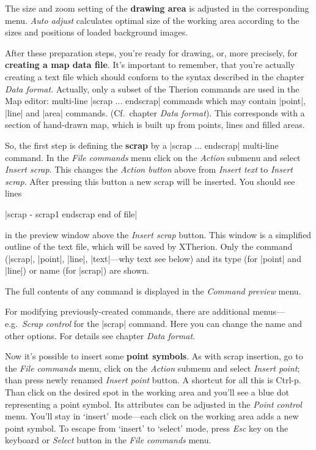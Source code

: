 The size and zoom setting of the {\bf drawing area} is adjusted in the 
corresponding menu. {\it Auto adjust} calculates optimal size of the working 
area according to the sizes and positions of loaded background images.

After these preparation steps, you're ready for drawing, or, more 
precisely, for {\bf creating a map data file}. It's important to remember, 
that you're actually creating a text file which should conform to the syntax 
described in the chapter {\it Data format}. Actually, only a subset of the 
Therion commands are used in the Map editor: multi-line |scrap ... endscrap|
commands which may contain |point|, |line| and |area| commands. (Cf.~chapter 
{\it Data format}). This corresponds with a section of hand-drawn map, which is 
built up from points, lines and filled areas.

So, the first step is defining the {\bf scrap} by a |scrap ... endscrap| 
multi-line command.  In the {\it File commands} menu click on the {\it Action} 
submenu and select {\it Insert scrap}. This changes the {\it Action button} 
above from {\it Insert text} to {\it Insert scrap}. After pressing this button a 
new scrap will be inserted. You should see lines

|scrap - scrap1
endscrap
end of file|

in the preview window above the {\it Insert scrap} button. This window is a 
simplified outline of the text file, which will be saved by XTherion. Only 
the command (|scrap|, |point|, |line|, |text|---why text see below) and its 
type (for |point| and |line|) or name (for |scrap|) are shown. 

The full contents of any command is displayed in the {\it Command preview} 
menu.

For modifying previously-created commands, there are additional 
menus---e.g.~{\it Scrap control} for the |scrap| command. Here you can 
change the name and other options. For details see chapter {\it Data format}.

Now it's possible to insert some {\bf point symbols}. As with scrap 
insertion, go to the {\it File commands} menu, click on the {\it Action} 
submenu and select {\it Insert point}; than press newly renamed {\it Insert 
point} button. A shortcut for all this is Ctrl-p. Than click on the desired 
spot in the working area and you'll see a blue dot representing a point 
symbol. Its attributes can be adjusted in the {\it Point control} menu.
You'll stay in `insert' mode---each click on the working area adds a new 
point symbol. To escape from `insert' to `select' mode, press {\it Esc} key 
on the keyboard or {\it Select} button in the {\it File commands} menu.

